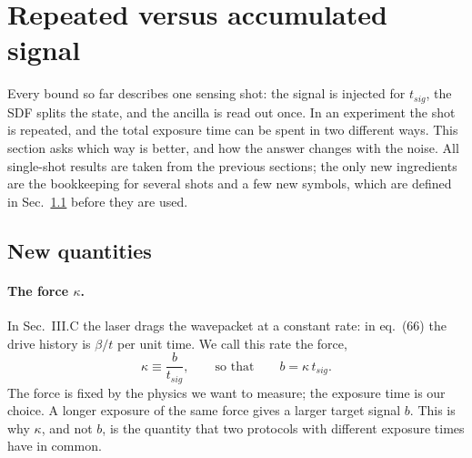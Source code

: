
\section{Repeated versus accumulated signal}
\label{sec:repeated}

Every bound so far describes one sensing shot: the signal is injected for $t_{sig}$, the SDF splits the state, and the ancilla is read out once. In an experiment the shot is repeated, and the total exposure time can be spent in two different ways. This section asks which way is better, and how the answer changes with the noise. All single-shot results are taken from the previous sections; the only new ingredients are the bookkeeping for several shots and a few new symbols, which are defined in Sec.~\ref{sec:rep-defs} before they are used.

\subsection{New quantities}
\label{sec:rep-defs}

\paragraph{The force $\kappa$.} In Sec.~III.C the laser drags the wavepacket at a constant rate: in eq.~(66) the drive history is $\beta/t$ per unit time. We call this rate the force,
\begin{equation}
\label{eq:R-kappa}
    \kappa \equiv \frac{b}{t_{sig}} ,
    \qquad\text{so that}\qquad
    b = \kappa\, t_{sig}.
\end{equation}
The force is fixed by the physics we want to measure; the exposure time is our choice. A longer exposure of the same force gives a larger target signal $b$. This is why $\kappa$, and not $b$, is the quantity that two protocols with different exposure times have in common.

